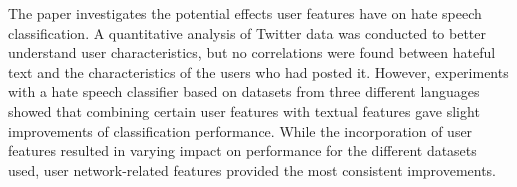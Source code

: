 The paper investigates the potential effects user features have on hate speech classification. A quantitative analysis of Twitter data was conducted to better understand user characteristics, but no correlations were found between hateful text and the characteristics of the users who had posted it. However, experiments with a hate speech classifier based on datasets from three different languages showed that combining certain user features with textual features gave slight improvements of classification performance. While the incorporation of user features resulted in varying impact on performance for the different datasets used, user network-related features provided the most consistent improvements.
